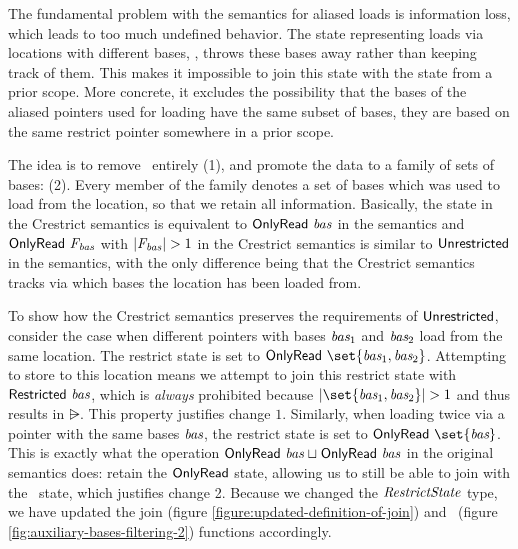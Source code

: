 The fundamental problem with the semantics for aliased loads is information loss, which leads to too much undefined behavior.
The state representing loads via locations with different bases, \unrestricted, throws these bases away
rather than keeping track of them.
This makes it impossible to join this state with the \restricted{\Basesvar} state from a prior scope. More concrete, it excludes
the possibility that the bases of the aliased pointers used for loading have the same subset
of bases, \ie they are based on the same restrict pointer somewhere in a prior scope.

The idea is to remove \unrestricted \ entirely (1), and promote the \onlyread{\Basesvar} data to a family of sets of bases:
\onlyread{\Basesfamvar} (2).
Every member of the family denotes a set of bases which was used to load from the location, so that we retain all information.
Basically, the state \onlyread{\set{\Basesvar}} in the Crestrict semantics is equivalent to $\mathsf{OnlyRead} \ \textit{bas}$ in the \cink{} semantics
and $\mathsf{OnlyRead} \ \textit{F}\textsubscript{\textit{bas}}$ with $\lvert\textit{F}\textsubscript{\textit{bas}}\rvert > 1$ in the Crestrict semantics is similar to
$\mathsf{Unrestricted}$ in the \cink{} semantics, with the only difference being that the Crestrict semantics tracks via which bases
the location has been loaded from.

To show how the Crestrict semantics preserves the requirements of $\mathsf{Unrestricted}$, consider the case when different pointers with bases $\textit{bas}_1$ and $\textit{bas}_2$ load from the same location.
The restrict state is set to $\onlyread{\set{\Basesvar_1, \Basesvar_2}}$.
Attempting to store to this location means we attempt to join this restrict state with $\mathsf{Restricted} \ \textit{bas}$, which is
\textit{always} prohibited because $\lvert\set{\Basesvar_1, \Basesvar_2}\rvert > 1$ and thus results in $\rsub$. This property
justifies change $1$. Similarly, when loading twice via a pointer with the same bases $\textit{bas}$, the restrict state
is set to $\onlyread{\set{\Basesvar}}$. This is exactly what the operation $\mathsf{OnlyRead} \ \textit{bas} \mathrel{\sqcup} \mathsf{OnlyRead} \ \textit{bas}$
in the original \cink{} semantics does: retain the $\mathsf{OnlyRead}$ state, allowing us to still be able to
join with the \restrictedn \ state, which justifies change 2.
Because we changed the $\textit{RestrictState}$ type, we have updated the join (figure \ref{figure:updated-definition-of-join}) and \filterbases \ (figure \ref{fig:auxiliary-bases-filtering-2}) functions accordingly.

